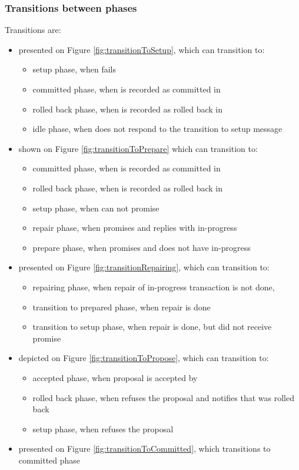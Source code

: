 \subsubsection{Transitions between phases}
Transitions are:
\begin{itemize}
\item \setupTransition presented on Figure \ref{fig:transitionToSetup}, which can transition to:
	\begin{itemize}
		\item setup phase, when  fails
		\item committed phase, when \txState is recorded as committed in \txLog  
		\item rolled back phase, when \txState is recorded as rolled back in \txLog
		\item idle phase, when  does not respond to the transition to setup message
	\end{itemize}
\item \prepareTransition shown on Figure \ref{fig:transitionToPrepare} which can transition to:
	\begin{itemize}
		\item committed phase, when \txState is recorded as committed in \txLog  
		\item rolled back phase, when \txState is recorded as rolled back in \txLog\item setup phase, when  can not promise
		\item repair phase, when  promises and replies with in-progress \txState
		\item prepare phase, when  promises and does not have in-progress \txState 
	\end{itemize}
\item \repairingTransition presented on Figure \ref{fig:transitionRepairing}, which can transition to:
	\begin{itemize}
		\item repairing phase, when repair of in-progress transaction is not done,
		\item transition to prepared phase, when repair is done
		\item transition to setup phase, when repair is done, but  did not receive promise
	\end{itemize}
\item \proposeTransition depicted on Figure \ref{fig:transitionToPropose}, which can transition to:
	\begin{itemize}
		\item accepted phase, when proposal is accepted by 
		\item rolled back phase, when  refuses the proposal and notifies that \txState was rolled back
		\item setup phase, when  refuses the proposal
	\end{itemize}
\item \commitTransition presented on Figure \ref{fig:transitionToCommitted}, which transitions to committed phase
\end{itemize}

